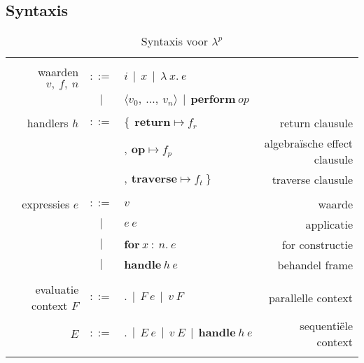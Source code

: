 \subsection{Syntaxis}
\begin{table}
    \centering
    \begin{tabular}{|r c l r|}
    \hline
         & & & \\ 
         waarden $v,\:f,\:n$ & $::=$ & $i \: \: | \: \: x \: \: | \: \: \lambda \:x.\:e \: \:$ & \\
         & $|$ & $\langle v_{0},\: ... , \: v_{n} \rangle \: \: | \: \: \textbf{perform}\:op$ & \\
         & & & \\
         handlers $h$ & $::=$ & $\{ \: \: \textbf{return} \mapsto f_{r}$ & return clausule\\
         & & $, \: \textbf{op} \mapsto f_{p}$ & algebraïsche effect  clausule \\
         & & $, \: \textbf{traverse} \mapsto f_{t} \: \} $ & traverse clausule \\
         & & & \\
         expressies $e$ & $::=$ & $v$ & waarde \\
          & $|$ & $e\:e$ & applicatie \\
          & $|$ & $\textbf{for}\:x\::\:n.\:e$ & for constructie \\
          & $|$ & $\textbf{handle}\:h\:e$ & behandel frame \\
         & & & \\
         evaluatie context $F$ & $::=$ & $. \: \: | \: \: F \: e \: \: | \: \: v\:F$ & parallelle context \\
         $E$ & $::=$ & $. \: \: | \:\: E\:e \: \: | \: \: v\:E \:\: | \:\: \textbf{handle}\:h\:e$ & sequentiële context\\
         & & & \\
    \hline
    \end{tabular}
    \caption{Syntaxis voor $\lambda^{p}$}
    \label{fig:syntaxisPar}
\end{table}

